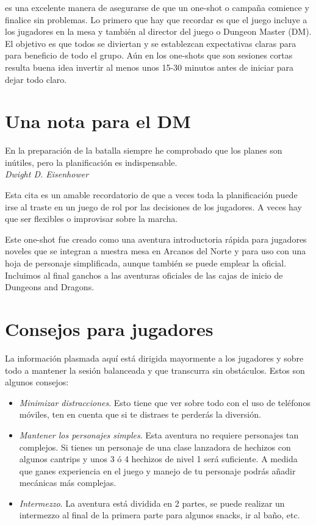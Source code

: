 \documentclass[10pt,twoside,twocolumn,openany]{dndbook}
\begin{document}
 es una excelente manera de asegurarse de que un one-shot o 
campaña comience y finalice sin problemas. Lo primero que hay que recordar es que el juego incluye 
a los jugadores en la mesa y también al director del juego o Dungeon Master (DM). El objetivo es 
que todos se diviertan y se establezcan expectativas claras para para beneficio de todo el grupo. 
Aún en los one-shots que son sesiones cortas resulta buena idea invertir al menos unos 15-30 
minutos antes de iniciar para dejar todo claro.

\section*{Una nota para el DM}

\begin{DndReadAloud}
  En la preparación de la batalla siempre he comprobado que los planes son inútiles, pero la 
  planificación es indispensable. \\
  \emph{Dwight D. Eisenhower}
\end{DndReadAloud}

Esta cita es un amable recordatorio de que a veces toda la planificación puede irse al traste 
en un juego de rol por las decisiones de los jugadores. A veces hay que ser flexibles o improvisar 
sobre la marcha.

Este one-shot fue creado como una aventura introductoria rápida para jugadores noveles que se integran 
a nuestra mesa en Arcanos del Norte y para uso con una hoja de personaje simplificada, aunque 
también se puede emplear la oficial. Incluimos al final ganchos a las aventuras oficiales de las 
cajas de inicio de Dungeons and Dragons.

\section*{Consejos para jugadores}

La información plasmada aquí está dirigida mayormente a los jugadores y sobre todo a mantener la 
sesión balanceada y que transcurra sin obstáculos. Estos son algunos consejos:

\begin{itemize}
  \item \emph{Minimizar distracciones}. Esto tiene que ver sobre todo con el uso de teléfonos 
  móviles, ten en cuenta que si te distraes te perderás la diversión.
  \item \emph{Mantener los personajes simples}. Esta aventura no requiere personajes tan complejos.
  Si tienes un personaje de una clase lanzadora de hechizos con algunos cantrips y unos 3 ó 4 
  hechizos de nivel 1 será suficiente. A medida que ganes experiencia en el juego y manejo de tu 
  personaje podrás añadir mecánicas más complejas.
  \item \emph{Intermezzo}. La aventura está dividida en 2 partes, se puede realizar un intermezzo 
  al final de la primera parte para algunos snacks, ir al baño, etc.
\end{itemize}
\end{document}
